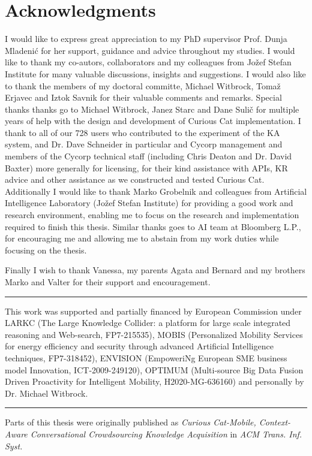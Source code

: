 % 
\chapter*{Acknowledgments}
I would like to express great appreciation to my PhD supervisor Prof. Dunja 
Mladenić for her support, guidance and advice throughout my studies. 
I would like to thank my co-autors, collaborators and
my colleagues from Jožef Stefan Institute for many valuable discussions, 
insights and suggestions. 
I would also like to thank the members of my doctoral committe, 
Michael Witbrock, Tomaž Erjavec and Iztok Savnik for their valuable comments and
remarks. 
Special thanks thanks go to Michael Witbrock, Janez Starc and Dane Sulič for
multiple years of help with the design and development of Curious Cat 
implementation. I thank to all of our 728 users who contributed 
to the experiment of the KA system, and Dr. Dave Schneider in particular and 
Cycorp management and members of the Cycorp technical staff (including Chris 
Deaton and Dr. David Baxter) more generally for licensing, for their kind 
assistance with APIs, KR advice and other assistance as we constructed and 
tested Curious Cat.
Additionally I would like to thank Marko Grobelnik and colleagues from
Artificial Intelligence Laboratory (Jožef Stefan Institute) for providing a 
good work and research environment, enabling me to focus on the research and
implementation required to finish this thesis. Similar thanks goes to AI team
at Bloomberg L.P., for encouraging me and allowing me to abstain from my work
duties while focusing on the thesis.

Finally I wish to thank Vanessa, my parents Agata and Bernard and my brothers
Marko and Valter for their support and encouragement.

\rule{0.5\textwidth}{.4pt}

This work was supported and partially financed by European Commission under
LARKC (The Large Knowledge Collider: a platform for large scale integrated
reasoning and Web-search, FP7-215535), MOBIS (Personalized Mobility Services 
for energy efficiency and security through advanced Artificial Intelligence 
techniques, FP7-318452), ENVISION (EmpoweriNg European SME business model 
Innovation, ICT-2009-249120), OPTIMUM (Multi-source Big Data Fusion Driven 
Proactivity for Intelligent Mobility, H2020-MG-636160) and personally by 
Dr. Michael Witbrock.

\rule{0.5\textwidth}{.4pt}

Parts of this thesis were originally published as \emph{Curious Cat-Mobile, 
	Context-Aware Conversational Crowdsourcing Knowledge Acquisition} in 
\emph{ACM Trans. Inf. Syst.}